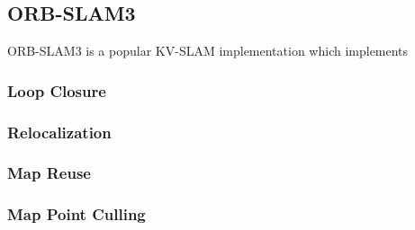 \subsection{ORB-SLAM3}

ORB-SLAM3 is a popular KV-SLAM implementation which implements 

\subsubsection{Loop Closure}
\subsubsection{Relocalization}
\subsubsection{Map Reuse}
\subsubsection{Map Point Culling}